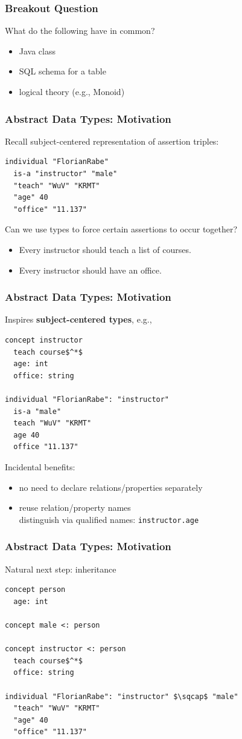 \begin{frame}\frametitle{Breakout Question}
What do the following have in common?
\begin{itemize}
\item Java class
\item SQL schema for a table
\item logical theory (e.g., Monoid)
\end{itemize}
\end{frame}

\begin{frame}[fragile]\frametitle{Abstract Data Types: Motivation}
Recall subject-centered representation of assertion triples:

\begin{lstlisting}
individual "FlorianRabe"
  is-a "instructor" "male"
  "teach" "WuV" "KRMT"
  "age" 40
  "office" "11.137"
\end{lstlisting}

Can we use types to force certain assertions to occur together?
\begin{itemize}
\item Every instructor should teach a list of courses.
\item Every instructor should have an office.
\end{itemize}
\end{frame}

\begin{frame}[fragile]\frametitle{Abstract Data Types: Motivation}
Inspires \textbf{subject-centered types}, e.g.,

\begin{lstlisting}
concept instructor
  teach course$^*$
  age: int
  office: string

individual "FlorianRabe": "instructor"
  is-a "male"
  teach "WuV" "KRMT"
  age 40
  office "11.137"
\end{lstlisting}

Incidental benefits:
\begin{itemize}
\item no need to declare relations/properties separately
\item reuse relation/property names \\ distinguish via qualified names: \lstinline|instructor.age|
\end{itemize}
\end{frame}

\begin{frame}[fragile]\frametitle{Abstract Data Types: Motivation}
Natural next step: inheritance

\begin{lstlisting}
concept person
  age: int
  
concept male <: person

concept instructor <: person
  teach course$^*$
  office: string

individual "FlorianRabe": "instructor" $\sqcap$ "male"
  "teach" "WuV" "KRMT"
  "age" 40
  "office" "11.137"
\end{lstlisting}

\end{frame}

